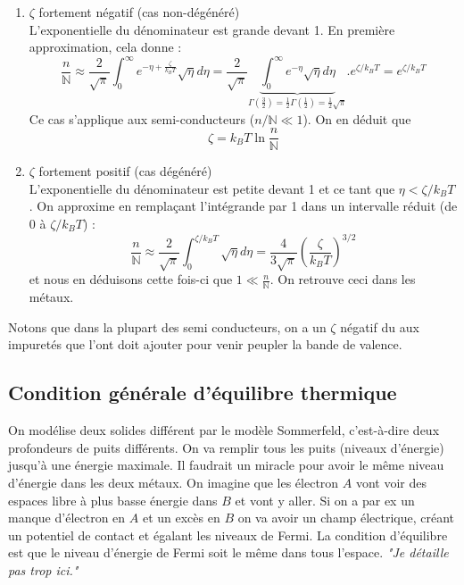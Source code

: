 \begin{enumerate}
	\item $\zeta$ fortement négatif (cas non-dégénéré)\\
	      L'exponentielle du dénominateur est grande devant 1. En première 
	      approximation, cela donne :
	      \begin{equation}
	      	\frac{n}{\mathbb{N}} \approx \frac{2}{\sqrt{\pi}}\int_0^\infty e^{-
	      		\eta + \frac{\zeta}{k_BT}}\sqrt{\eta}d\eta = \frac{2}{\sqrt{\pi}}
	      	\underbrace{\int_0^\infty e^{-\eta} \sqrt{\eta}d\eta}_{\Gamma(\frac{3
	      		}{2}) = \frac{1}{2}\Gamma(\frac{1}{2}) = \frac{1}{2}\sqrt{\pi}}.e^{
	      	\zeta/k_BT} = e^{\zeta/k_BT}
	      \end{equation}
	      Ce cas s'applique aux semi-conducteurs ($n/\mathbb{N}\ll 1$). On en 
	      déduit que
	      \begin{equation}
	      	\zeta = k_BT\ln\frac{n}{\mathbb{N}}
	      \end{equation}
	\item $\zeta$ fortement positif (cas dégénéré)\\
	      L'exponentielle du dénominateur est petite devant 1 et ce tant que $
	      \eta < \zeta/k_BT$. On approxime en remplaçant l'intégrande par 1 dans 
	      un intervalle réduit (de 0 à $\zeta/k_BT$) :
	      \begin{equation}
	      	\frac{n}{\mathbb{N}} \approx \frac{2}{\sqrt{\pi}}\int_0^{\zeta/k_BT} 
	      	\sqrt{\eta}d\eta = \frac{4}{3\sqrt{\pi}}\left(\frac{\zeta}{k_BT}\right)^{
	      	3/2}
	      \end{equation}
	      et nous en déduisons cette fois-ci que $1 \ll \frac{n}{\mathbb{N}}$. On 
	      retrouve ceci dans les métaux.
\end{enumerate}
Notons que dans la plupart des semi conducteurs, on a un $\zeta$ négatif du 
aux impuretés que l'ont doit ajouter pour venir peupler la bande de valence.



\subsection{Condition générale d'équilibre thermique}
On modélise deux solides différent par le modèle Sommerfeld, c'est-à-dire 
deux profondeurs de puits différents. On va remplir tous les puits (niveaux 
d'énergie) jusqu'à une énergie maximale. Il faudrait un miracle pour avoir 
le même niveau d'énergie dans les deux métaux. On imagine que les électron 
$A$ vont voir des espaces libre à plus basse énergie dans $B$ et vont y aller. 
Si on a par ex un manque d'électron en $A$ et un excès en $B$ on va avoir un 
champ électrique, créant un potentiel de contact et égalant les niveaux de 
Fermi. La condition d'équilibre est que le niveau d'énergie de Fermi soit le 
même dans tous l'espace. \textit{"Je détaille pas trop ici."} 

